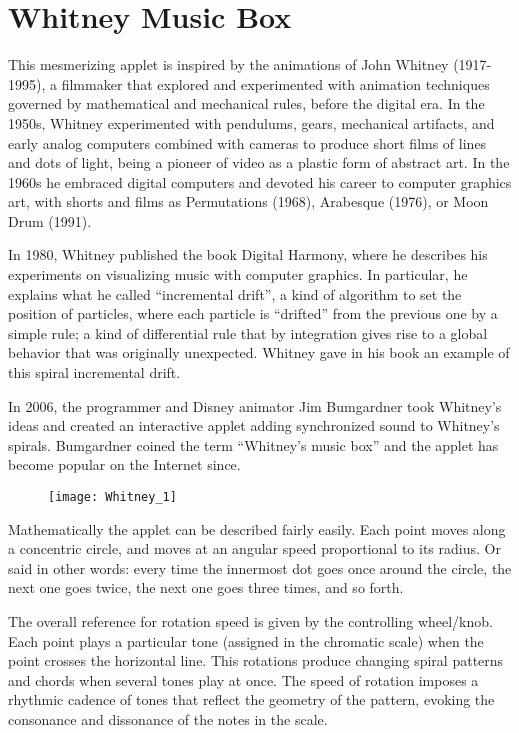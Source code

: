 \section{Whitney Music Box}
This mesmerizing applet is inspired by the animations of John Whitney (1917-1995), a filmmaker that explored and experimented with animation techniques governed by mathematical and mechanical rules, before the digital era. In the 1950s, Whitney experimented with pendulums, gears, mechanical artifacts, and early analog computers combined with cameras to produce short films of lines and dots of light, being a pioneer of video as a plastic form of abstract art. In the 1960s he embraced digital computers and devoted his career to computer graphics art, with shorts and films as Permutations (1968), Arabesque (1976), or Moon Drum (1991).

In 1980, Whitney published the book Digital Harmony, where he describes his experiments on visualizing music with computer graphics. In particular, he explains what he called ``incremental drift'', a kind of algorithm to set the position of particles, where each particle is ``drifted'' from the previous one by a simple rule; a kind of differential rule that by integration gives rise to a global behavior that was originally unexpected. Whitney gave in his book an example of this spiral incremental drift. 

In 2006, the programmer and Disney animator Jim Bumgardner took Whitney's ideas and created an interactive applet adding synchronized sound to Whitney's spirals. Bumgardner coined the term ``Whitney's music box'' and the applet has become popular on the Internet since.

\begin{figure}[h]
\centering
\texttt{[image: Whitney\_1]}
\end{figure}

Mathematically the applet can be described fairly easily. Each point moves along a concentric circle, and moves at an angular speed proportional to its radius. Or said in other words: every time the innermost dot goes once around the circle, the next one goes twice, the next one goes three times, and so forth. 

The overall reference for rotation speed is given by the controlling wheel/knob. Each point plays a particular tone (assigned in the chromatic scale) when the point crosses the horizontal line. This rotations produce changing spiral patterns and chords when several tones play at once. The speed of rotation imposes a rhythmic cadence of tones that reflect the geometry of the pattern, evoking the consonance and dissonance of the notes in the scale.

